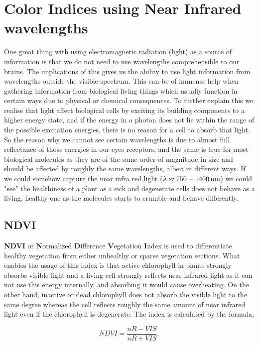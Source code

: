 \section{Color Indices using Near Infrared wavelengths}

One great thing with using electromagnetic radiation (light) as a source of information is that we do not need to use wavelengths comprehensible to our brains. The implications of this gives us the ability to use light information from wavelengths outside the visible spectrum. This can be of immense help when gathering information from biological living things which usually function in certain ways due to physical or chemical consequences. To further explain this we realise that light affect biological cells by exciting its building components to a higher energy state, and if the energy in a photon does not lie within the range of the possible excitation energies, there is no reason for a cell to absorb that light. So the reason why we cannot see certain wavelengths is due to almost full reflectance of those energies in our eyes receptors, and the same is true for most biological molecules as they are of the same order of magnitude in size and should be affected by roughly the same wavelengths, albeit in different ways. If we could somehow capture the near infra red light ($\lambda \approx \unit[750-1400]{nm}$) we could "see" the healthiness of a plant as a sick and degenerate cells does not behave as a living, healthy one as the molecules starts to crumble and behave differently.

\subsection{NDVI}

\textbf{NDVI} or \textbf{N}ormalized \textbf{D}ifference \textbf{V}egetation \textbf{I}ndex is used to differentiate healthy vegetation from either unhealthy or sparse vegetation  sections\cite{ndviSource}. What enables the usage of this index is that active chlorophyll in plants strongly absorbs visible light and a living cell strongly reflects near infrared light as it can not use this energy internally, and absorbing it would cause overheating. On the other hand, inactive or dead chlorophyll does not absorb the visible light to the same degree whereas the cell reflects roughly the same amount of near infrared light even if the chlorophyll is degenerate. The index is calculated by the formula,

\begin{equation}
	\label{eq:ndvi}
	NDVI = \frac{nR-VIS}{nR+VIS},
\end{equation}

